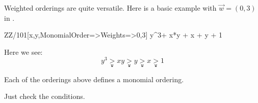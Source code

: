 \documentclass{ximera}
\begin{document}
Weighted orderings are quite versatile. Here is a basic example with
$\vec{w} = (0,3)$ in \macaulay.

\begin{macaulay2}
ZZ/101[x,y,MonomialOrder=>{Weights=>{0,3}}]
y^3+ x*y + x + y + 1
\end{macaulay2}

Here we see:
\[
y^3 \underset{\mathtt{w}}{>} xy \underset{\mathtt{w}}{>} y \underset{\mathtt{w}}{>} x \underset{\mathtt{w}}{>} 1
\]

\begin{proposition}
  Each of the orderings above defines a monomial ordering.
  \begin{sketch}
    Just check the conditions.
  \end{sketch}
\end{proposition}
\end{document}

